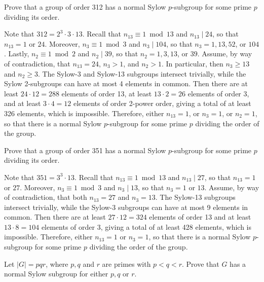 \begin{exercise}\label{ex4.5.14}
	Prove that a group of order 312 has a normal Sylow $p$-subgroup for some prime $p$ dividing its order.
\end{exercise}

\begin{sol}
	Note that $312 = 2^3 \cdot 3 \cdot 13$. Recall that $n_{13} \equiv 1 \bmod 13$ and $n_{13} \mid 24$, so that $n_{13} = 1$ or $24$. Moreover, $n_3 \equiv 1 \bmod 3$ and $n_3 \mid 104$, so that $n_3 = 1, 13, 52$, or $104$. Lastly, $n_2 \equiv 1 \bmod 2$ and $n_2 \mid 39$, so that $n_2 = 1, 3, 13$, or $39$. Assume, by way of contradiction, that $n_{13} = 24$, $n_3 > 1$, and $n_2 > 1$. In particular, then $n_3 \geq 13$ and $n_2 \geq 3$. The Sylow-3 and Sylow-13 subgroups intersect trivially, while the Sylow 2-subgroups can have at most 4 elements in common. Then there are at least $24 \cdot 12 = 288$ elements of order 13, at least $13 \cdot 2 = 26$ elements of order 3, and at least $3 \cdot 4 = 12$ elements of order 2-power order, giving a total of at least 326 elements, which is impossible. Therefore, either $n_{13} = 1$, or $n_3 = 1$, or $n_2 = 1$, so that there is a normal Sylow $p$-subgroup for some prime $p$ dividing the order of the group.
\end{sol}

\begin{exercise}\label{ex4.5.15}
	Prove that a group of order 351 has a normal Sylow $p$-subgroup for some prime $p$ dividing its order.
\end{exercise}

\begin{sol}
	Note that $351 = 3^3 \cdot 13$. Recall that $n_{13} \equiv 1 \bmod 13$ and $n_{13} \mid 27$, so that $n_{13} = 1$ or $27$. Moreover, $n_3 \equiv 1 \bmod 3$ and $n_3 \mid 13$, so that $n_3 = 1$ or $13$. Assume, by way of contradiction, that both $n_{13} = 27$ and $n_3 = 13$. The Sylow-13 subgroups intersect trivially, while the Sylow-3 subgroups can have at most 9 elements in common. Then there are at least $27 \cdot 12 = 324$ elements of order 13 and at least $13 \cdot 8 = 104$ elements of order 3, giving a total of at least 428 elements, which is impossible. Therefore, either $n_{13} = 1$ or $n_3 = 1$, so that there is a normal Sylow $p$-subgroup for some prime $p$ dividing the order of the group.
\end{sol}

\begin{exercise}\label{ex4.5.16}
	Let $|G| = pqr$, where $p, q$ and $r$ are primes with $p < q < r$. Prove that $G$ has a normal Sylow subgroup for either $p, q$ or $r$.
\end{exercise}

